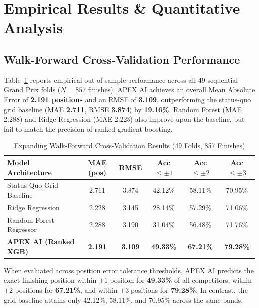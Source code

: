 \documentclass[journal]{IEEEtran}
\begin{document}
\section{Empirical Results \& Quantitative Analysis}
\label{sec:results}

\subsection{Walk-Forward Cross-Validation Performance}
Table~\ref{tab:walk_forward_results} reports empirical out-of-sample performance across all 49 sequential Grand Prix folds ($N = 857$ finishes). APEX AI achieves an overall Mean Absolute Error of \textbf{2.191 positions} and an RMSE of \textbf{3.109}, outperforming the status-quo grid baseline (MAE \textbf{2.711}, RMSE \textbf{3.874}) by \textbf{19.16\%}. Random Forest (MAE 2.288) and Ridge Regression (MAE 2.228) also improve upon the baseline, but fail to match the precision of ranked gradient boosting.

\begin{table}[!htbp]
\centering
\caption{Expanding Walk-Forward Cross-Validation Results (49 Folds, 857 Finishes)}
\label{tab:walk_forward_results}
\begin{tabular}{lccccc}
\toprule
\textbf{Model Architecture} & \textbf{MAE (pos)} & \textbf{RMSE} & \textbf{Acc $\le \pm 1$} & \textbf{Acc $\le \pm 2$} & \textbf{Acc $\le \pm 3$} \\
\midrule
Status-Quo Grid Baseline & 2.711 & 3.874 & 42.12\% & 58.11\% & 70.95\% \\
Ridge Regression & 2.228 & 3.145 & 28.14\% & 57.29\% & 71.06\% \\
Random Forest Regressor & 2.288 & 3.190 & 31.04\% & 56.48\% & 71.76\% \\
\textbf{APEX AI (Ranked XGB)} & \textbf{2.191} & \textbf{3.109} & \textbf{49.33\%} & \textbf{67.21\%} & \textbf{79.28\%} \\
\bottomrule
\end{tabular}
\end{table}

When evaluated across position error tolerance thresholds, APEX AI predicts the exact finishing position within $\pm 1$ position for \textbf{49.33\%} of all competitors, within $\pm 2$ positions for \textbf{67.21\%}, and within $\pm 3$ positions for \textbf{79.28\%}. In contrast, the grid baseline attains only 42.12\%, 58.11\%, and 70.95\% across the same bands.
\end{document}

